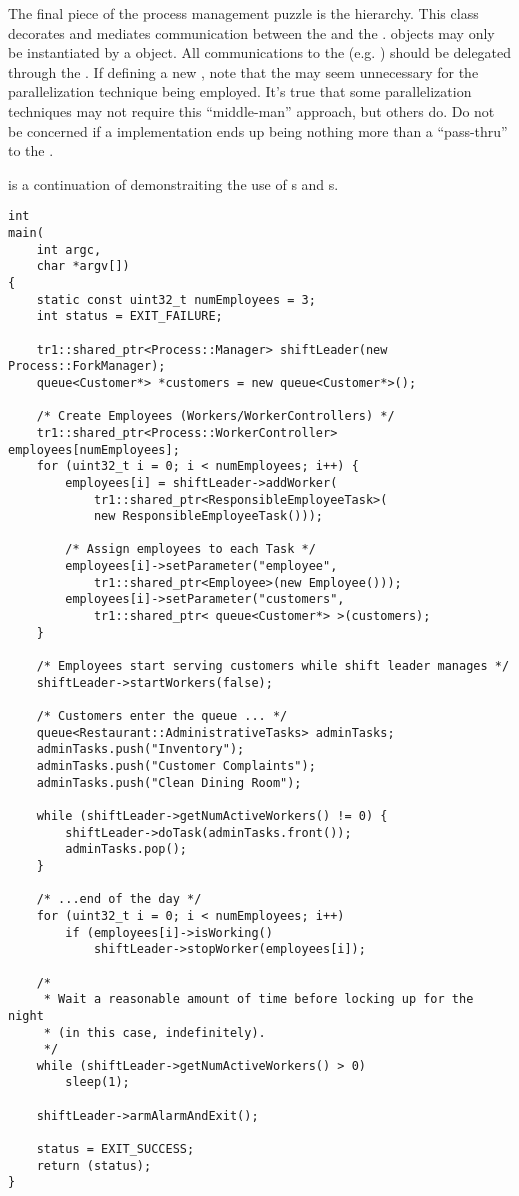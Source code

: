The final piece of the process management puzzle is the
 hierarchy.  This class decorates and
mediates communication between the  and the .  
 objects may only be instantiated by
a  object.  All communications to the 
(e.g. ) should be delegated through the
.  If defining a new , note
that the  may seem unnecessary for the
parallelization technique being employed.  It's true
that some parallelization techniques may not require this ``middle-man''
approach, but others do.  Do not be concerned if a  implementation ends up being nothing more than a ``pass-thru'' to
the .

 is a continuation of
 demonstraiting the use of s and
s.

\begin{lstlisting}[caption={Using \class{Manager}s and \class{WorkerController}s}, label=process_manager-example]
int
main(
    int argc,
    char *argv[])
{
	static const uint32_t numEmployees = 3;
	int status = EXIT_FAILURE;
	
	tr1::shared_ptr<Process::Manager> shiftLeader(new Process::ForkManager);
	queue<Customer*> *customers = new queue<Customer*>();
	
	/* Create Employees (Workers/WorkerControllers) */
	tr1::shared_ptr<Process::WorkerController> employees[numEmployees];
	for (uint32_t i = 0; i < numEmployees; i++) {
		employees[i] = shiftLeader->addWorker(
		    tr1::shared_ptr<ResponsibleEmployeeTask>(
		    new ResponsibleEmployeeTask()));
		
		/* Assign employees to each Task */
		employees[i]->setParameter("employee",
		    tr1::shared_ptr<Employee>(new Employee()));
		employees[i]->setParameter("customers",
		    tr1::shared_ptr< queue<Customer*> >(customers);
	}
	
	/* Employees start serving customers while shift leader manages */
	shiftLeader->startWorkers(false);
	
	/* Customers enter the queue ... */
	queue<Restaurant::AdministrativeTasks> adminTasks;
	adminTasks.push("Inventory");
	adminTasks.push("Customer Complaints");
	adminTasks.push("Clean Dining Room");
	
	while (shiftLeader->getNumActiveWorkers() != 0) {
		shiftLeader->doTask(adminTasks.front());
		adminTasks.pop();
	}
	
	/* ...end of the day */
	for (uint32_t i = 0; i < numEmployees; i++)
		if (employees[i]->isWorking()
			shiftLeader->stopWorker(employees[i]);
	
	/* 
	 * Wait a reasonable amount of time before locking up for the night
	 * (in this case, indefinitely).
	 */
	while (shiftLeader->getNumActiveWorkers() > 0)
		sleep(1);
		
	shiftLeader->armAlarmAndExit();
	
	status = EXIT_SUCCESS;	
	return (status);
}

\end{lstlisting}
